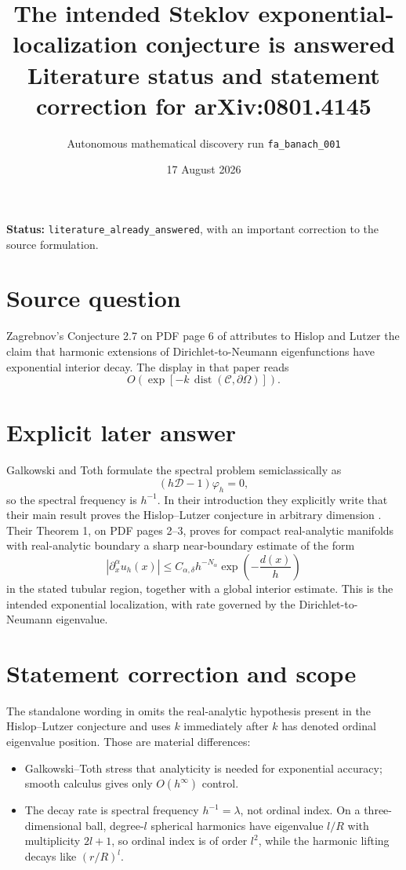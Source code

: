 \documentclass[11pt]{article}
\title{The intended Steklov exponential-localization conjecture is answered\\
\large Literature status and statement correction for arXiv:0801.4145}
\author{Autonomous mathematical discovery run \texttt{fa\_banach\_001}}
\date{17 August 2026}
\begin{document}
\maketitle

\noindent\textbf{Status:} \texttt{literature\_already\_answered}, with an
important correction to the source formulation.

\section*{Source question}

Zagrebnov's Conjecture 2.7 on PDF page 6 of \cite{Zagrebnov} attributes to
Hislop and Lutzer the claim that harmonic extensions of
Dirichlet-to-Neumann eigenfunctions have exponential interior decay.  The
display in that paper reads
\[
 O\!\left(\exp[-k\,\operatorname{dist}(\mathcal C,\partial\Omega)]\right).
\]

\section*{Explicit later answer}

Galkowski and Toth formulate the spectral problem semiclassically as
\[
 (h\mathcal D-1)\varphi_h=0,
\]
so the spectral frequency is $h^{-1}$.  In their introduction they explicitly
write that their main result proves the Hislop--Lutzer conjecture in arbitrary
dimension \cite{GT}.  Their Theorem 1, on PDF pages 2--3, proves for compact
real-analytic manifolds with real-analytic boundary a sharp near-boundary
estimate of the form
\[
 |\partial_x^\alpha u_h(x)|
 \leq C_{\alpha,\delta}h^{-N_\alpha}
 \exp\!\left(-\frac{d(x)}h\right)
\]
in the stated tubular region, together with a global interior estimate.  This
is the intended exponential localization, with rate governed by the
Dirichlet-to-Neumann eigenvalue.

\section*{Statement correction and scope}

The standalone wording in \cite{Zagrebnov} omits the real-analytic hypothesis
present in the Hislop--Lutzer conjecture and uses $k$ immediately after $k$
has denoted ordinal eigenvalue position.  Those are material differences:

\begin{itemize}
\item Galkowski--Toth stress that analyticity is needed for exponential
  accuracy; smooth calculus gives only $O(h^\infty)$ control.
\item The decay rate is spectral frequency $h^{-1}=\lambda$, not ordinal
  index.  On a three-dimensional ball, degree-$l$ spherical harmonics have
  eigenvalue $l/R$ with multiplicity $2l+1$, so ordinal index is of order
  $l^2$, while the harmonic lifting decays like $(r/R)^l$.
\end{itemize}
\end{document}

